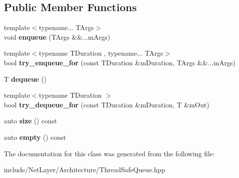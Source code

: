 \subsection*{Public Member Functions}
\begin{DoxyCompactItemize}
\item 
\hypertarget{classnl_1_1impl_1_1ThreadSafeQueue_aba290c00615c2a3d7226ece08139fa9d}{}{\footnotesize template$<$typename... T\+Args$>$ }\\void {\bfseries enqueue} (T\+Args \&\&...m\+Args)\label{classnl_1_1impl_1_1ThreadSafeQueue_aba290c00615c2a3d7226ece08139fa9d}

\item 
\hypertarget{classnl_1_1impl_1_1ThreadSafeQueue_a63e740704fd67c4eeb1a1539db3a92dd}{}{\footnotesize template$<$typename T\+Duration , typename... T\+Args$>$ }\\bool {\bfseries try\+\_\+enqueue\+\_\+for} (const T\+Duration \&m\+Duration, T\+Args \&\&...m\+Args)\label{classnl_1_1impl_1_1ThreadSafeQueue_a63e740704fd67c4eeb1a1539db3a92dd}

\item 
\hypertarget{classnl_1_1impl_1_1ThreadSafeQueue_a7e6eb4c05f8e58219d4890f2de418d40}{}T {\bfseries dequeue} ()\label{classnl_1_1impl_1_1ThreadSafeQueue_a7e6eb4c05f8e58219d4890f2de418d40}

\item 
\hypertarget{classnl_1_1impl_1_1ThreadSafeQueue_a99ec655141bbafed60b6d15c8fdfd6e8}{}{\footnotesize template$<$typename T\+Duration $>$ }\\bool {\bfseries try\+\_\+dequeue\+\_\+for} (const T\+Duration \&m\+Duration, T \&m\+Out)\label{classnl_1_1impl_1_1ThreadSafeQueue_a99ec655141bbafed60b6d15c8fdfd6e8}

\item 
\hypertarget{classnl_1_1impl_1_1ThreadSafeQueue_a6b308dfe4c501bba96fd8506a1d88010}{}auto {\bfseries size} () const \label{classnl_1_1impl_1_1ThreadSafeQueue_a6b308dfe4c501bba96fd8506a1d88010}

\item 
\hypertarget{classnl_1_1impl_1_1ThreadSafeQueue_a9aa3cf7fb8ebdc816dc6104e41aa81f0}{}auto {\bfseries empty} () const \label{classnl_1_1impl_1_1ThreadSafeQueue_a9aa3cf7fb8ebdc816dc6104e41aa81f0}

\end{DoxyCompactItemize}


The documentation for this class was generated from the following file\+:\begin{DoxyCompactItemize}
\item 
include/\+Net\+Layer/\+Architecture/Thread\+Safe\+Queue.\+hpp\end{DoxyCompactItemize}
